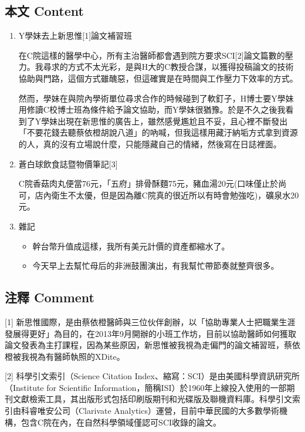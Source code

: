 \documentclass[a5paper, 11pt
]{book}
\providecommand{\tightlist}{%
  \setlength{\itemsep}{0pt}\setlength{\parskip}{0pt}}
\begin{document}
\hypertarget{ux672cux6587-content-4}{%
\subsection{本文 Content}\label{ux672cux6587-content-4}}

\begin{enumerate}
\def\labelenumi{\arabic{enumi}.}
\item
  Y學妹去上新思惟{[}1{]}論文補習班

  在C院這樣的醫學中心，所有主治醫師都會遇到院方要求SCI{[}2{]}論文篇數的壓力。我尋求的方式不太光彩，是與H大的C教授合謀，以獲得投稿論文的技術協助與門路，這個方式雖醜惡，但這確實是在時間與工作壓力下效率的方式。

  然而，學妹在與院內學術單位尋求合作的時候碰到了軟釘子，H博士要Y學妹用修讀C校博士班為條件給予論文協助，而Y學妹很猶豫。於是不久之後我看到了Y學妹出現在新思惟的廣告上，雖然感覺尷尬且不妥，且心裡不斷發出「不要花錢去聽蔡依橙胡說八道」的吶喊，但我這樣用藏汙納垢方式拿到資源的人，真的沒有立場說什麼，只能隱藏自己的情緒，然後寫在日誌裡面。
\item
  蒼白球飲食誌暨物價筆記{[}3{]}

  C院香菇肉丸便當76元，「五府」排骨酥麵75元，豬血湯20元(口味僅止於尚可，店內衛生不太優，但是因為離C院真的很近所以有時會勉強吃)，礦泉水20元。
\item
  雜記

  \begin{itemize}
  \tightlist
  \item
    幹台幣升值成這樣，我所有美元計價的資產都縮水了。
  \item
    今天早上去幫忙母后的非洲鼓團演出，有我幫忙帶節奏就整齊很多。
  \end{itemize}
\end{enumerate}

\hypertarget{ux6ce8ux91cb-comment-4}{%
\subsection{注釋 Comment}\label{ux6ce8ux91cb-comment-4}}

{[}1{]}
新思惟國際，是由蔡依橙醫師與三位伙伴創辦，以「協助專業人士把職業生涯發展得更好」為目的，在2013年9月開辦的小班工作坊，目前以協助醫師如何獲取論文發表為主打課程，因為某些原因，新思惟被我視為走偏門的論文補習班，蔡依橙被我視為有醫師執照的XDite。

{[}2{]} 科學引文索引（Science Citation
Index、縮寫：SCI）是由美國科學資訊研究所（Institute for Scientific
Information，簡稱ISI）於1960年上線投入使用的一部期刊文獻檢索工具，其出版形式包括印刷版期刊和光碟版及聯機資料庫。科學引文索引由科睿唯安公司（Clarivate
Analytics）運營，目前中華民國的大多數學術機構，包含C院在內，在自然科學領域僅認可SCI收錄的論文。
\end{document}
